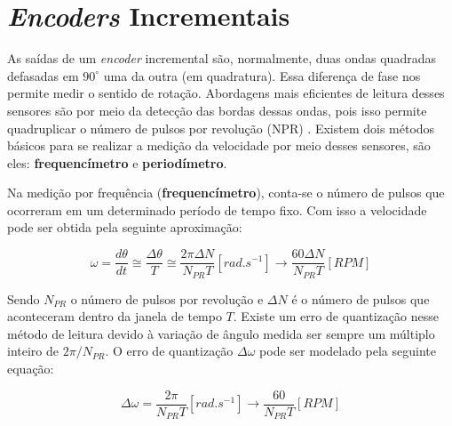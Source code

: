 \section{\textit{Encoders} Incrementais}
\label{sec:encoders}


As saídas de um \emph{encoder} incremental são, normalmente, duas ondas quadradas defasadas em $90^\circ$ uma da outra (em quadratura). Essa diferença de fase nos permite medir o sentido de rotação. Abordagens mais eficientes de leitura desses sensores são por meio da detecção das bordas dessas ondas, pois isso permite quadruplicar o número de pulsos por revolução (NPR) \cite{quantization_error01}. Existem dois métodos básicos para se realizar a medição da velocidade por meio desses sensores, são eles: \textbf{frequencímetro} e \textbf{periodímetro}. 

Na medição por frequência (\textbf{frequencímetro}), conta-se o número de pulsos que ocorreram em um determinado período de tempo fixo. Com isso a velocidade pode ser obtida pela seguinte aproximação:

\begin{equation}
    \omega = \frac{d\theta}{dt} \cong \frac{\Delta{\theta}}{T} \cong \frac{2 \pi \Delta{N}}{N_{PR}T}[rad.s^{-1}] \xrightarrow{} \frac{60 \Delta{N}}{N_{PR} T} [RPM]
\end{equation}

Sendo $N_{PR}$ o número de pulsos por revolução e $\Delta{N}$ é o número de pulsos que aconteceram dentro da janela de tempo $T$. Existe um erro de quantização nesse método de leitura devido à variação de ângulo medida ser sempre um múltiplo inteiro de $ 2\pi/N_{PR}$. O erro de quantização $\Delta{\omega}$ pode ser modelado pela seguinte equação:

\begin{equation}
    \Delta{\omega} = \frac{2\pi}{N_{PR}T}[rad.s^{-1}] \xrightarrow{} \frac{60}{N_{PR}T}[RPM]
    \label{eq:erro_de_quantizacao_frequencimetro}
\end{equation}

